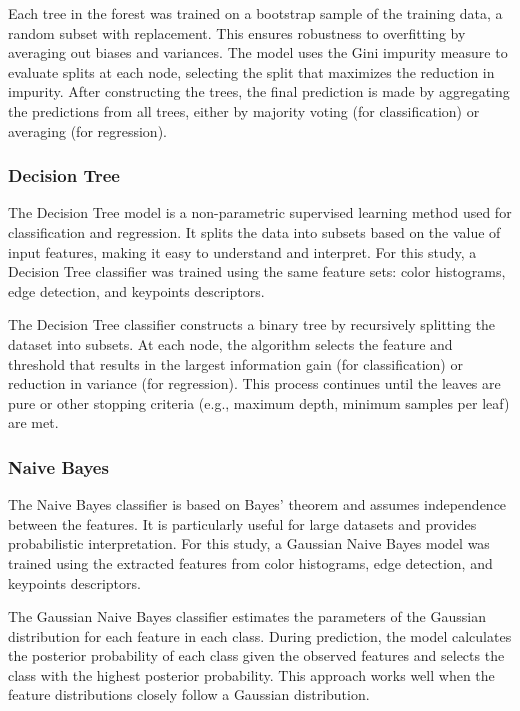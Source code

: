 \documentclass[10pt,twocolumn,letterpaper]{article}
\begin{document}
Each tree in the forest was trained on a bootstrap sample of the training data, a random subset with replacement. This ensures robustness to overfitting by averaging out biases and variances. The model uses the Gini impurity measure to evaluate splits at each node, selecting the split that maximizes the reduction in impurity. After constructing the trees, the final prediction is made by aggregating the predictions from all trees, either by majority voting (for classification) or averaging (for regression).

\subsubsection{Decision Tree}

The Decision Tree model is a non-parametric supervised learning method used for classification and regression. It splits the data into subsets based on the value of input features, making it easy to understand and interpret. For this study, a Decision Tree classifier was trained using the same feature sets: color histograms, edge detection, and keypoints descriptors.

The Decision Tree classifier constructs a binary tree by recursively splitting the dataset into subsets. At each node, the algorithm selects the feature and threshold that results in the largest information gain (for classification) or reduction in variance (for regression). This process continues until the leaves are pure or other stopping criteria (e.g., maximum depth, minimum samples per leaf) are met.

\subsubsection{Naive Bayes}

The Naive Bayes classifier is based on Bayes' theorem and assumes independence between the features. It is particularly useful for large datasets and provides probabilistic interpretation. For this study, a Gaussian Naive Bayes model was trained using the extracted features from color histograms, edge detection, and keypoints descriptors.

The Gaussian Naive Bayes classifier estimates the parameters of the Gaussian distribution for each feature in each class. During prediction, the model calculates the posterior probability of each class given the observed features and selects the class with the highest posterior probability. This approach works well when the feature distributions closely follow a Gaussian distribution.
\end{document}
